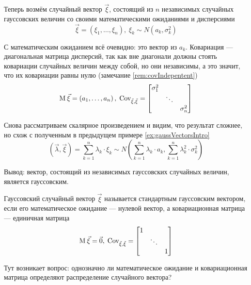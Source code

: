 \begin{example}\label{example:gaussianVector:gaussianElements}
    Теперь возмём случайный вектор $\vec{\xi}$, состоящий из $n$ независимых
    случайных гауссовских величин со своими математическими ожиданиями
    и дисперсиями
    $$\vec{\xi} = \left( \xi_1, \dots, \xi_n \right),\;
        \xi_k \sim N\left( a_k, \sigma_k^2 \right)$$

    С математическим ожиданием всё очевидно: это вектор
    из $a_k$. Ковариация --- диагональная матрица дисперсий, так как вне
    диагонали должны стоять ковариации случайных величин между собой,
    но они независимы, а это значит, что их ковариации равны нулю
    (замечание \ref{rem:covIndepentent})
    $$\operatorname{M}_{} \vec{\xi} = \left( a_1, \dots, a_n \right),\;
        \operatorname{Cov^{}_{\vec{\xi}, \vec{\xi}}} =
        \begin{bmatrix}
            \sigma_1^2 & & \\
            & \ddots & \\
            & & \sigma_n^2
        \end{bmatrix}$$

    Снова рассматриваем скалярное произведением и видим, что результат сложнее,
    но схож с полученным в предыдущем примере \ref{ex:gaussVectorsIntro}
    $$\left( \vec{\lambda}, \vec{\xi} \right)
        = \sum_{k=1}^{n} \lambda_k \cdot \xi_k \sim
        N\left( \sum_{k=1}^{n} \lambda_k \cdot a_k,
        \sum_{k=1}^{n} \lambda_k^2 \cdot \sigma_k^2 \right)$$

    Вывод: вектор, состоящий из независимых гауссовских случайных величин,
    является гауссовским.
\end{example}

\begin{definition}
    Гауссовский случайный вектор $\vec{\xi}$ называется стандартным гауссовским
    вектором, если его математическое ожидание --- нулевой вектор,
    а ковариационная матрица --- единичная матрица
    $$\operatorname{M}_{} \vec{\xi} = \vec{0},\;
        \operatorname{Cov^{}_{\vec{\xi}, \vec{\xi}}} =
        \begin{bmatrix}
            1 & & \\
            & \ddots & \\
            & & 1
        \end{bmatrix}$$
\end{definition}

Тут возникает вопрос: однозначно ли математическое ожидание
и ковариационная матрица определяют распределение случайного вектора?

